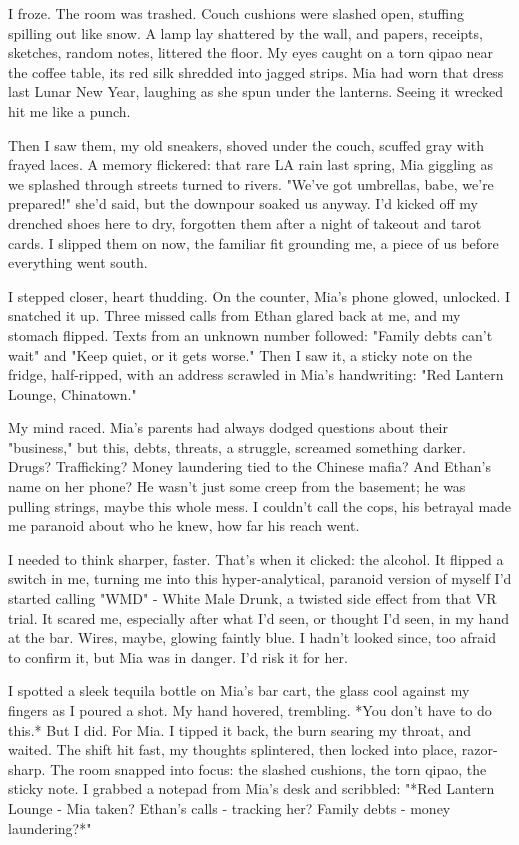 \documentclass{article}
\begin{document}
I froze. The room was trashed. Couch cushions were slashed open, stuffing spilling out like snow. A lamp lay shattered by the wall, and papers, receipts, sketches, random notes, littered the floor. My eyes caught on a torn qipao near the coffee table, its red silk shredded into jagged strips. Mia had worn that dress last Lunar New Year, laughing as she spun under the lanterns. Seeing it wrecked hit me like a punch.

Then I saw them, my old sneakers, shoved under the couch, scuffed gray with frayed laces. A memory flickered: that rare LA rain last spring, Mia giggling as we splashed through streets turned to rivers. "We've got umbrellas, babe, we're prepared!" she'd said, but the downpour soaked us anyway. I'd kicked off my drenched shoes here to dry, forgotten them after a night of takeout and tarot cards. I slipped them on now, the familiar fit grounding me, a piece of us before everything went south.

I stepped closer, heart thudding. On the counter, Mia's phone glowed, unlocked. I snatched it up. Three missed calls from Ethan glared back at me, and my stomach flipped. Texts from an unknown number followed: "Family debts can't wait" and "Keep quiet, or it gets worse." Then I saw it, a sticky note on the fridge, half-ripped, with an address scrawled in Mia's handwriting: "Red Lantern Lounge, Chinatown."

My mind raced. Mia's parents had always dodged questions about their "business," but this, debts, threats, a struggle, screamed something darker. Drugs? Trafficking? Money laundering tied to the Chinese mafia? And Ethan's name on her phone? He wasn't just some creep from the basement; he was pulling strings, maybe this whole mess. I couldn't call the cops, his betrayal made me paranoid about who he knew, how far his reach went.

I needed to think sharper, faster. That's when it clicked: the alcohol. It flipped a switch in me, turning me into this hyper-analytical, paranoid version of myself I'd started calling "WMD" - White Male Drunk, a twisted side effect from that VR trial. It scared me, especially after what I'd seen, or thought I'd seen, in my hand at the bar. Wires, maybe, glowing faintly blue. I hadn't looked since, too afraid to confirm it, but Mia was in danger. I'd risk it for her.

I spotted a sleek tequila bottle on Mia's bar cart, the glass cool against my fingers as I poured a shot. My hand hovered, trembling. *You don't have to do this.* But I did. For Mia. I tipped it back, the burn searing my throat, and waited. The shift hit fast, my thoughts splintered, then locked into place, razor-sharp. The room snapped into focus: the slashed cushions, the torn qipao, the sticky note. I grabbed a notepad from Mia's desk and scribbled: "*Red Lantern Lounge - Mia taken? Ethan's calls - tracking her? Family debts - money laundering?*"
\end{document}
